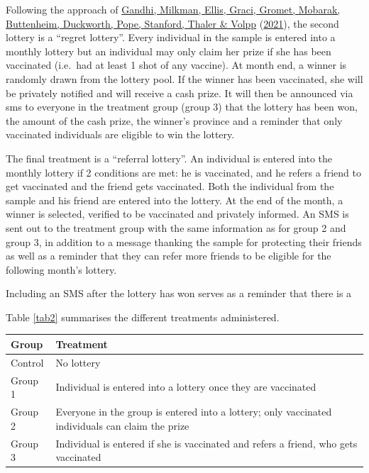 \documentclass[11pt,preprint, authoryear]{elsarticle}
\let\origtable\table
\let\endorigtable\endtable
\renewenvironment{table}[1][2] {
    \expandafter\origtable\expandafter[H]
} {
    \endorigtable
}
\numberwithin{equation}{section}
\numberwithin{figure}{section}
\numberwithin{table}{section}
\begin{document}
Following the approach of \protect\hyperlink{ref-regret}{Gandhi,
Milkman, Ellis, Graci, Gromet, Mobarak, Buttenheim, Duckworth, Pope,
Stanford, Thaler \& Volpp} (\protect\hyperlink{ref-regret}{2021}), the
second lottery is a ``regret lottery''. Every individual in the sample
is entered into a monthly lottery but an individual may only claim her
prize if she has been vaccinated (i.e.~had at least 1 shot of any
vaccine). At month end, a winner is randomly drawn from the lottery
pool. If the winner has been vaccinated, she will be privately notified
and will receive a cash prize. It will then be announced via sms to
everyone in the treatment group (group 3) that the lottery has been won,
the amount of the cash prize, the winner's province and a reminder that
only vaccinated individuals are eligible to win the lottery.

The final treatment is a ``referral lottery''. An individual is entered
into the monthly lottery if 2 conditions are met: he is vaccinated, and
he refers a friend to get vaccinated and the friend gets vaccinated.
Both the individual from the sample and his friend are entered into the
lottery. At the end of the month, a winner is selected, verified to be
vaccinated and privately informed. An SMS is sent out to the treatment
group with the same information as for group 2 and group 3, in addition
to a message thanking the sample for protecting their friends as well as
a reminder that they can refer more friends to be eligible for the
following month's lottery.

Including an SMS after the lottery has won serves as a reminder that
there is a

Table \ref{tab2} summarises the different treatments administered.

\begin{table}[H]
\centering
\begin{tabular}{ll}
  \toprule
Group & Treatment \\ 
  \midrule
Control & No lottery \\ 
  Group 1 & Individual is entered into a lottery once they are vaccinated \\ 
  Group 2 & Everyone in the group is entered into a lottery; only vaccinated individuals can claim the prize \\ 
  Group 3 & Individual is entered if she is vaccinated and refers a friend, who gets vaccinated \\ 
   \bottomrule
\end{tabular}
\caption{Treatment Summary \label{tab2}} 
\end{table}
\end{document}
